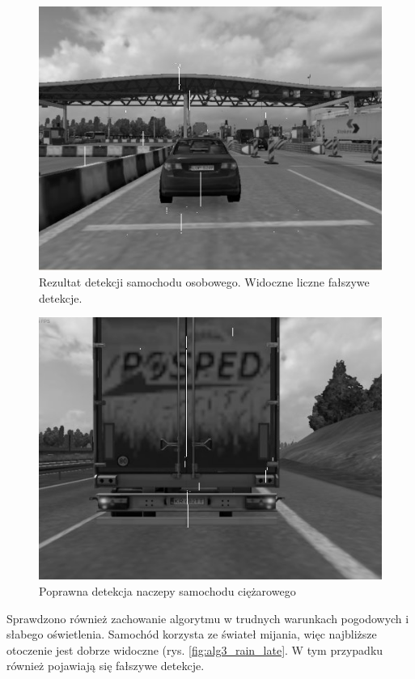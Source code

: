 \begin{figure}
  \centering
  \includegraphics[width=13cm]{img/alg3_res.jpg}
  \caption{Rezultat detekcji samochodu osobowego. Widoczne liczne fałszywe detekcje.}
  \label{fig:alg3_res1}
\end{figure}

\begin{figure}
  \centering
  \includegraphics[width=13cm]{img/alg3_res2.jpg}
  \caption{Poprawna detekcja naczepy samochodu ciężarowego}
  \label{fig:alg3_res2}
\end{figure}

Sprawdzono również zachowanie algorytmu w trudnych warunkach pogodowych i słabego oświetlenia. 
Samochód korzysta ze świateł mijania, więc najbliższe otoczenie jest dobrze widoczne (rys. \ref{fig:alg3_rain_late}. 
W tym przypadku również pojawiają się fałszywe detekcje.

